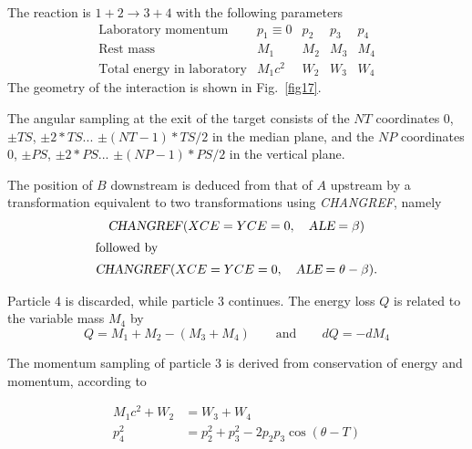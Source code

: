 { The reaction is $ 1+2 \longrightarrow  3+4 $ with the following parameters 
$$
\begin{array}{lllll}
	\text{Laboratory momentum} & p_1\equiv  0 &  p_2 &   p_3 &    p_4 \\
	\text{Rest mass}           &   M_1        &   M_2 & M_3 &    M_4 \\ 
	\text{Total energy in laboratory} & M_1c^2 &  W_2 &    W_3 &   W_4 
\end{array}
$$
%
 The geometry of the interaction is shown in Fig.~\ref{fig17}.   
\medskip

\noindent The angular  sampling at the exit of the target consists of the $ NT$ 
coordinates 0,  $ \pm TS$,  $ \pm 2\ast TS$...   $\pm (NT-1)\ast TS/2 $ 
in the median plane, 
and the $ NP $ coordinates 0, $ \pm PS$,  $ \pm 2\ast PS$... $ \pm (NP-1)\ast PS/2$ 
in the vertical plane.  
\medskip

\noindent The position of $ B $ downstream is deduced from that of $ A $
upstream  by a transformation equivalent to two transformations using \textsl{CHANGREF},
 namely
 \begin{gather*}
	 \text{\textsl{CHANGREF}}(XCE=YCE=0,\quad  \textsl{ALE}=\beta )  \\
\intertext{followed by} 
	 \text{\textsl{CHANGREF}}(XCE=YCE=0,\quad \textsl{ALE}=\theta -\beta ). 
 \end{gather*}

 
\noindent Particle  4 is discarded, while particle 3 continues. The energy
loss $ Q $ is related to the variable mass $ M_4 $ by
$$ Q=M_1+M_2-(M_3+M_4)\qquad \text{and} \qquad dQ=-dM_4 $$

\noindent The momentum sampling of particle 3 is derived from conservation of
energy and 
momentum, according to 

\begin{align*}
	M_1c^2+W_2 & =  W_3+W_4  \\
	p^2_4 & =  p^2_2 +p^2_3 -2p_2p_3 \cos (\theta -T) 
\end{align*}


}
